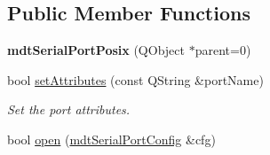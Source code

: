 \subsection*{Public Member Functions}
\begin{DoxyCompactItemize}
\item 
\hypertarget{classmdt_serial_port_posix_ab42543a4500bc207985ddad3082b1f4c}{
{\bfseries mdtSerialPortPosix} (QObject $\ast$parent=0)}
\label{classmdt_serial_port_posix_ab42543a4500bc207985ddad3082b1f4c}

\item 
bool \hyperlink{classmdt_serial_port_posix_a1440f504f0ed43210b9c0b1cd5506663}{setAttributes} (const QString \&portName)
\begin{DoxyCompactList}\small\item\em Set the port attributes. \end{DoxyCompactList}\item 
\hypertarget{classmdt_serial_port_posix_afb1bcf27cc39cd962913b056ca8d4ccc}{
bool \hyperlink{classmdt_serial_port_posix_afb1bcf27cc39cd962913b056ca8d4ccc}{open} (\hyperlink{classmdt_serial_port_config}{mdtSerialPortConfig} \&cfg)}
\label{classmdt_serial_port_posix_afb1bcf27cc39cd962913b056ca8d4ccc}


\end{DoxyCompactItemize}
